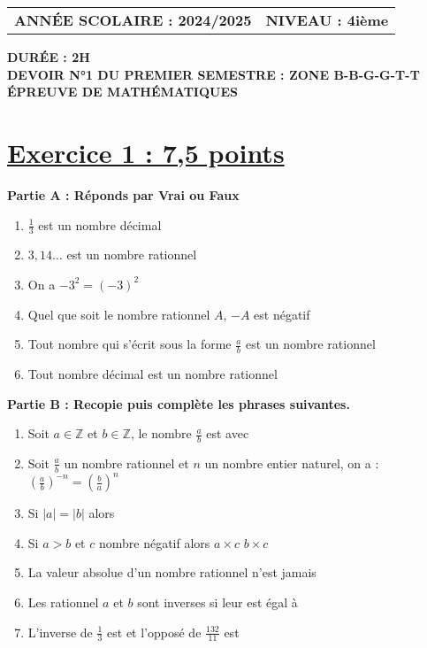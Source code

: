 \documentclass{article}
\begin{document}
\thispagestyle{firstpage}

\noindent
\begin{tabular}{@{}p{}p{}@{}}
    \textbf{ANNÉE SCOLAIRE : 2024/2025} & \raggedleft \textbf{NIVEAU : 4ième}
\end{tabular}

\vspace{0.5cm}

\begin{center}
    \textbf{DURÉE : 2H}\\
    \textbf{DEVOIR N°1 DU PREMIER SEMESTRE : ZONE B-B-G-G-T-T}\\
    \textbf{\Large ÉPREUVE DE MATHÉMATIQUES}
\end{center}

\vspace{0.5cm}

\section*{\underline{Exercice 1 : 7,5 points}}

\textbf{Partie A : Réponds par Vrai ou Faux}

\begin{enumerate}
    \item $\frac{1}{3}$ est un nombre décimal \dotfill
    \item $3,14\ldots$ est un nombre rationnel \dotfill
    \item On a $-3^2 = (-3)^2$ \dotfill
    \item Quel que soit le nombre rationnel $A$, $-A$ est négatif \dotfill
    \item Tout nombre qui s'écrit sous la forme $\frac{a}{b}$ est un nombre rationnel \dotfill
    \item Tout nombre décimal est un nombre rationnel \dotfill
\end{enumerate}

\textbf{Partie B : Recopie puis complète les phrases suivantes.}

\begin{enumerate}
    \item Soit $a \in \mathbb{Z}$ et $b \in \mathbb{Z}$, le nombre $\frac{a}{b}$ est \dotfill avec \dotfill
    \item Soit $\frac{a}{b}$ un nombre rationnel et $n$ un nombre entier naturel, on a : 
    $\left(\frac{a}{b}\right)^{-n} = \left(\frac{b}{a}\right)^n$ \dotfill
    \item Si $|a| = |b|$ alors \dotfill
    \item Si $a > b$ et $c$ nombre négatif alors $a \times c$ \dotfill $b \times c$
    \item La valeur absolue d’un nombre rationnel n’est jamais \dotfill
    \item Les rationnel $a$ et $b$ sont inverses si leur \dotfill est égal à \dotfill
    \item L’inverse de $\frac{1}{3}$ est \dotfill et l’opposé de $\frac{132}{11}$ est \dotfill
\end{enumerate}
\end{document}
